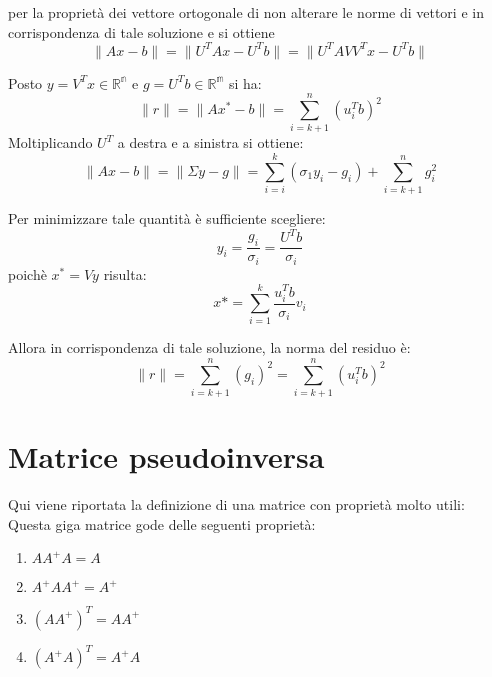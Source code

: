per la proprietà dei vettore ortogonale di non alterare le norme di vettori e in corrispondenza di tale soluzione e si ottiene 
\[
    \|Ax-b\| = \|U^TAx-U^Tb\| = \|U^T AVV^T x - U^Tb\|
\]

Posto $y = V^T x \in \mathbb{R^n}$ e $g=U^Tb\in \mathbb{R^m}$ si ha:
\[
    \|r\| = \|Ax^* - b\|= \sum_{i=k+1}^{n}(u^T_i b)^2
\]
Moltiplicando $U^T$ a destra e a sinistra si ottiene:
\[
    \|Ax-b\|=\|\Sigma y- g\| = \sum^k_{i=i}(\sigma_1y_i - g_i) + \sum^n_{i=k+1} g^2_i
\]

Per minimizzare tale quantità è sufficiente scegliere:
\[
    y_i = \frac{g_i}{\sigma_i} = \frac{U^T b}{\sigma_i}    
\]
poichè $x^* =Vy$ risulta:
\[
    x*=\sum_{i=1}^{k} \frac{u^T_i b }{\sigma_i}v_i   
\]

Allora in corrispondenza di tale soluzione, la norma del residuo è:
\[
    \|r\| = \sum_{i=k+1}^{n}(g_i)^2 = \sum_{i=k+1}^{n} (u^T_i b)^2   
\]
\section{Matrice pseudoinversa}
Qui viene riportata la definizione di una matrice con proprietà molto utili:
Questa giga matrice gode delle seguenti proprietà:
\begin{enumerate}
    \item \( AA^+ A = A \)
    \item \( A^+ AA^+ = A^+ \)
    \item \( (AA^+)^T = AA^+ \)
    \item \( (A^+ A)^T = A^+ A \)
\end{enumerate}

